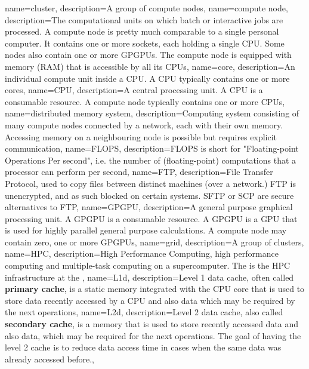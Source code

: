 {
  name={cluster},
  description={A group of compute nodes},
}
{
  name={compute node},
  description={The computational units on which batch or interactive jobs are processed. A compute node is pretty much comparable to a single personal computer. It contains one or more sockets, each holding a single CPU. Some nodes also contain one or more GPGPUs. The compute node is equipped with memory (RAM) that is accessible by all its CPUs},
}
{
  name={core},
  description={An individual compute unit inside a CPU. A CPU typically contains one or more cores},
}
{
  name={CPU},
  description={A central processing unit. A CPU is a consumable resource. A compute node typically contains one or more CPUs},
}
{
  name={distributed memory system},
  description={Computing system consisting of many compute nodes connected by a network, each with their own memory. Accessing memory on a neighbouring node is possible but requires explicit communication},
}
{
  name={FLOPS},
  description={FLOPS is short for "Floating-point Operations Per second", i.e. the number of (floating-point) computations that a processor can perform per second},
}
{
  name={FTP},
  description={File Transfer Protocol, used to copy files between distinct machines (over a network.) FTP is unencrypted, and as such blocked on certain systems. SFTP or SCP are secure alternatives to FTP},
}
{
  name={GPGPU},
  description={A general purpose graphical processing unit. A GPGPU is a consumable resource. A GPGPU is a GPU that is used for highly parallel general purpose calculations. A compute node may contain zero, one or more GPGPUs},
}
{
  name={grid},
  description={A group of clusters},
}
{
  name={HPC},
  description={High Performance Computing, high performance computing and multiple-task computing on a supercomputer. The \hpcInfra is the HPC infrastructure at the \university},
}
{
  name={L1d},
  description={Level 1 data cache, often called \textbf{primary cache}, is a static memory integrated with the CPU core that is used to store data recently accessed by a CPU and also data which may be required by the next operations},
}
{
  name={L2d},
  description={Level 2 data cache, also called \textbf{secondary cache}, is a memory that is used to store recently accessed data and also data, which may be required for the next operations. The goal of having the level 2 cache is to reduce data access time in cases when the same data was already accessed before.},
}

